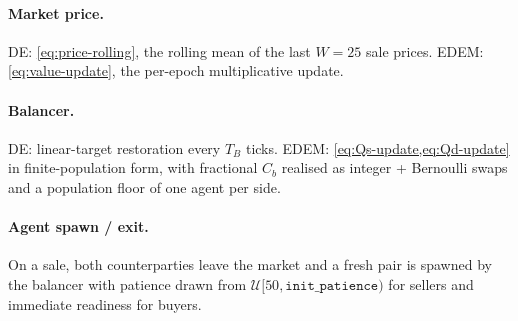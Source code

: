 \paragraph{Market price.} DE: \cref{eq:price-rolling}, the rolling
mean of the last $W = 25$ sale prices. EDEM: \cref{eq:value-update},
the per-epoch multiplicative update.

\paragraph{Balancer.} DE: linear-target restoration every $T_{B}$
ticks. EDEM: \cref{eq:Qs-update,eq:Qd-update} in finite-population
form, with fractional $C_{b}$ realised as integer + Bernoulli swaps
and a population floor of one agent per side.

\paragraph{Agent spawn / exit.} On a sale, both counterparties leave
the market and a fresh pair is spawned by the balancer with patience
drawn from $\mathcal{U}[50, \texttt{init\_patience})$ for sellers
and immediate readiness for buyers.
